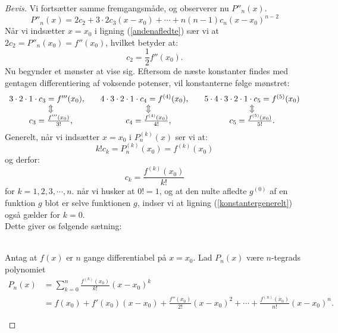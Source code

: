 \documentclass[12pt, a4paper]{article}
\begin{document}
\begin{refsection}
\begin{proof}[Bevis]
Vi fortsætter samme fremgangsmåde, og observerer nu $P''_n(x)$.
\begin{equation}\label{andenafledte}
    P''_n(x)=2c_2+ 3\cdot2c_3(x-x_0)+\cdots+n(n-1)c_n(x-x_0)^{n-2}
\end{equation}
Når vi indsætter $x=x_0$ i ligning (\ref{andenafledte}) sær vi at $2c_2 = P''_n(x_0)=f''(x_0)$, hvilket betyder at:
\begin{equation*}
    c_2=\frac{1}{2}f''(x_0).
\end{equation*}
Nu begynder et mønster at vise sig. Eftersom de næste konstanter findes med gentagen differentiering af voksende potenser, vil konstanterne følge mønstret: 
\begin{equation*}
    \begin{array}{c c c}
        3\cdot2\cdot1\cdot c_3=f'''(x_0),\quad &4\cdot3\cdot2\cdot1\cdot c_4=f^{(4)}(x_0),\quad&5\cdot4\cdot3\cdot2\cdot1\cdot c_5=f^{(5)}(x_0)\\
        \Updownarrow&\Updownarrow&\Updownarrow\\
        c_3=\frac{f'''(x_0)}{3!},&c_4=\frac{f^{(4)}(x_0)}{4!},&c_5=\frac{f^{(5)}(x_0)}{5!}.
    \end{array}
\end{equation*}
Generelt, når vi indsætter $x=x_0$ i $P_n^{(k)}(x)$ ser vi at:
\begin{equation*}
    k!c_k=P_n^{(k)}(x_0)=f^{(k)}(x_0)
\end{equation*}
og derfor:
\begin{equation}\label{konstantergenerelt}
    \boxed{c_k=\frac{f^{(k)}(x_0)}{k!}}
\end{equation}
for $k=1,2,3,\cdots,n$. når vi husker at $0!=1$, og at den nulte afledte  $g^{(0)}$ af en funktion $g$ blot er selve funktionen $g$, indser vi at ligning (\ref{konstantergenerelt}) også gælder for $k=0$.\\
Dette giver os følgende sætning:\\
\\
   \begin{savenotes}
\begin{mdframed}
Antag at $f(x)$ er $n$ gange differentiabel på $x=x_0$. Lad $P_n(x)$ være $n$-tegrads polynomiet
\begin{equation}\label{taylorpolynomier}
    \begin{aligned}
        P_n(x)&=\sum_{k=0}^n\frac{f^{(k)}(x_0)}{k!}(x-x_0)^k\\
              &=f(x_0)+f'(x_0)(x-x_0)+\frac{f''(x_0)}{2!}(x-x_0)^2+\cdots+\frac{f^{(n)}(x_0)}{n!}(x-x_0)^n.

\end{aligned}
\end{equation}
\end{mdframed}
\end{savenotes}
\end{proof}
\end{refsection}
\end{document}
